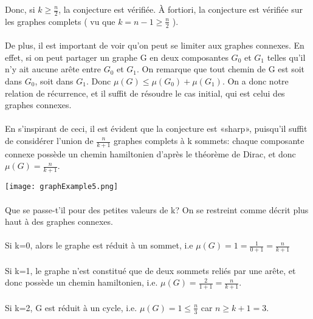 \documentclass[a4paper]{article}
\theoremstyle{definition}
\theoremstyle{remark}
\begin{document}
Donc, si $k \geq \frac{n}{2}$, la conjecture est vérifiée. À fortiori, la
conjecture est vérifiée sur les graphes complets ( vu que $k = n-1 \geq \frac{n}{2}$ ).


\paragraph{}
De plus, il est important de voir qu'on peut se limiter aux graphes connexes. En effet, si on peut partager un graphe G en deux composantes
$G_{0}$ et $G_{1}$ telles qu'il n'y ait aucune arête entre $G_{0}$ et $G_{1}$. On remarque que tout chemin de G est soit dans $G_{0}$, soit dans $G_{1}$.
Donc $\mu(G) \leq \mu(G_{0}) + \mu(G_{1})$. On a donc notre relation de
récurrence, et il suffit de résoudre le cas initial, qui est celui des graphes connexes.


\paragraph{}
En s'inspirant de ceci, il est évident que la conjecture est «sharp», puisqu'il suffit de considérer l'union de $\frac{n}{k+1}$ graphes complets à k sommets: chaque composante connexe possède un chemin 
hamiltonien d'après le théorème de Dirac, et donc $\mu(G)=\frac{n}{k+1}$.


\texttt{[image: graphExample5.png]}


\paragraph{}
Que se passe-t'il pour des petites valeurs de k? On se restreint comme décrit plus haut à des graphes connexes.


\paragraph{}
Si k=0, alors le graphe est réduit à un sommet, i.e $\mu(G)=1=\frac{1}{0+1}=\frac{n}{k+1}$


\paragraph{}
Si k=1, le graphe n'est constitué que de deux sommets reliés par une arête, et donc possède un chemin hamiltonien, i.e. $\mu(G)=\frac{2}{1+1}=\frac{n}{k+1}$.


\paragraph{}
Si k=2, G est réduit à un cycle, i.e. $\mu(G)=1 \leq \frac{n}{3}$ car $n \geq k+1 = 3$.
\end{document}
